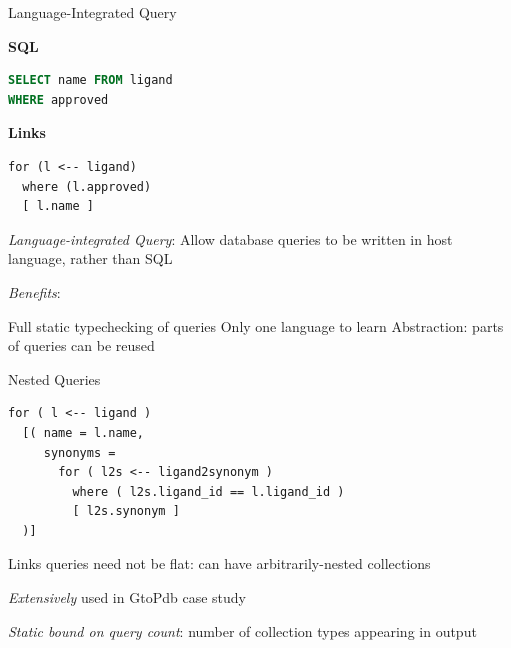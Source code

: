 \documentclass[11.5pt, aspectratio=169]{beamer}
\begin{document}
\begin{frame}[fragile]{Language-Integrated Query}

  \begin{minipage}[t]{0.45\textwidth}
    {\large \textbf{SQL}}
    \begin{lstlisting}[language=sql]
SELECT name FROM ligand
WHERE approved
    \end{lstlisting}
  \end{minipage}
  \hfill
  \begin{minipage}[t]{0.45\textwidth}
    {\large \textbf{Links}}
    \begin{lstlisting}[language=Links]
for (l <-- ligand)
  where (l.approved)
  [ l.name ]
    \end{lstlisting}
  \end{minipage}

  \begin{fullpageitemize}
  \item \emph{Language-integrated Query}: Allow database queries to be written in host language, rather than SQL
  \item \emph{Benefits}:
    \begin{itemize}
      \itemR Full static typechecking of queries
      \itemR Only one language to learn
      \itemR Abstraction: parts of queries can be reused
    \end{itemize}
  \end{fullpageitemize}
\end{frame}

\begin{frame}[fragile]{Nested Queries}

  \begin{lstlisting}[language=Links]
for ( l <-- ligand )
  [( name = l.name,
     synonyms =
       for ( l2s <-- ligand2synonym )
         where ( l2s.ligand_id == l.ligand_id )
         [ l2s.synonym ]
  )]
  \end{lstlisting}

  \begin{fullpageitemize}
    \item Links queries need not be flat: can have arbitrarily-nested collections
    \item \emph{Extensively} used in GtoPdb case study
    \item \emph{Static bound on query count}: number of collection types appearing in output
  \end{fullpageitemize}

\end{frame}
\end{document}
